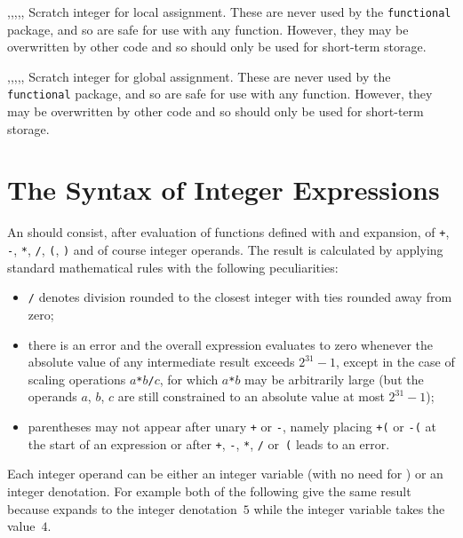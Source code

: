 \documentclass[oneside]{book}
\begin{document}
\begin{variable}{\lTmpaInt,\lTmpbInt,\lTmpcInt,\lTmpiInt,\lTmpjInt,\lTmpkInt}
Scratch integer for local assignment. These are never used by
the \verb!functional! package, and so are safe for use with any
function. However, they may be overwritten by other
code and so should only be used for short-term storage.
\end{variable}

\begin{variable}{\gTmpaInt,\gTmpbInt,\gTmpcInt,\gTmpiInt,\gTmpjInt,\gTmpkInt}
Scratch integer for global assignment. These are never used by
the \verb!functional! package, and so are safe for use with any
function. However, they may be overwritten by other
code and so should only be used for short-term storage.
\end{variable}

\section{The Syntax of Integer Expressions}

An  should consist,
after evaluation of functions defined with 
and expansion, of \texttt{+}, \texttt{-}, \texttt{*}, \texttt{/},
\texttt{(}, \texttt{)} and of course integer operands.  The result
is calculated by applying standard mathematical rules with the
following peculiarities:
\begin{itemize}
\item \texttt{/} denotes division rounded to the closest integer with
ties rounded away from zero;
\item there is an error and the overall expression evaluates to zero
whenever the absolute value of any intermediate result exceeds
$2^{31}-1$, except in the case of scaling operations
$a$\texttt{*}$b$\texttt{/}$c$, for which $a$\texttt{*}$b$ may be
arbitrarily large (but the operands $a$, $b$, $c$ are still
constrained to an absolute value at most $2^{31}-1$);
\item parentheses may not appear after unary \texttt{+} or
\texttt{-}, namely placing \texttt{+(} or \texttt{-(} at the start
of an expression or after \texttt{+}, \texttt{-}, \texttt{*},
\texttt{/} or~\texttt{(} leads to an error.
\end{itemize}
Each integer operand can be either an integer variable (with no need
for ) or an integer denotation.
For example both of the following give the same result
because  expands to the integer denotation~$5$
while the integer variable  takes the value~$4$.
\begin{demohigh}
\end{demohigh}
\begin{demohigh}
\tlNew \lFooSomeTl
\tlSet {}
\intNew \lFooSomeInt
\intSet {}
\end{demohigh}
\end{document}
